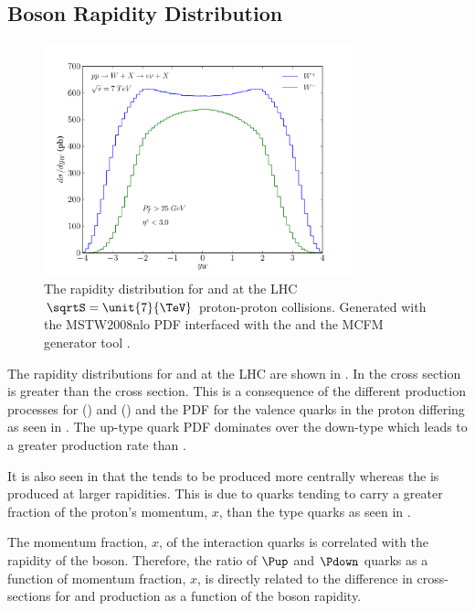 \subsection{\PW Boson Rapidity Distribution}
\label{wbos:wrapsec}


\begin{figure}[htbp]
  \centering
  \includegraphics[width=0.8\textwidth]{w-rapidity}
  \caption{The rapidity distribution for \PWp and \PWm at the LHC $\sqrtS=\unit{7}{\TeV}$ proton-proton collisions. 
Generated with the MSTW2008nlo PDF\cite{martin2009parton} interfaced with the
and the MCFM generator tool \cite{campbellmcfm}.}
  \label{wbos:wrapid}
\end{figure}

The rapidity distributions for \PWp and \PWm at the {LHC} are shown in
. 
In  the \PWp cross section is greater than the \PWm
cross section. This is a consequence of the different production processes for
\PWp () and \PWm () and the
{PDF} for the valence quarks in the proton differing as seen in
. The up-type quark {PDF} dominates over the
down-type which leads to a greater \PWp production rate than \PWm.

It is also seen in  that the \PWm tends to be produced
more centrally whereas the \PWp is produced at larger rapidities. This is due
to \Pup quarks tending to carry a greater fraction of the proton's momentum,
$x$, than the \Pdown type quarks as seen in .

The momentum fraction, $x$, of the interaction quarks is correlated with the
rapidity of the \PW boson. Therefore, the ratio of $\Pup$ and $\Pdown$ quarks as
a function of momentum fraction, $x$, is directly related to the difference in
cross-sections for \PWp and \PWm production as a function of the boson rapidity.

